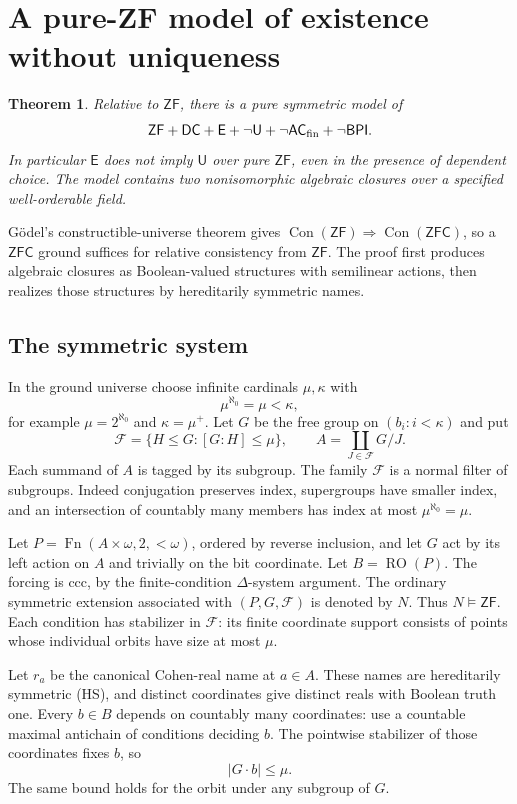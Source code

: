 \documentclass[11pt,a4paper]{article}
\newtheorem{theorem}{Theorem}[section]
\theoremstyle{definition}\newtheorem{definition}[theorem]{Definition}
\theoremstyle{remark}\newtheorem{remark}[theorem]{Remark}
\newcommand{\ZF}{\mathsf{ZF}}\newcommand{\ZFA}{\mathsf{ZFA}}
\newcommand{\E}{\mathsf E}\newcommand{\U}{\mathsf U}
\newcommand{\ACfin}{\mathsf{AC}_{\mathrm{fin}}}
\begin{document}
\section{A pure-ZF model of existence without uniqueness}\label{sec:pure-separation}
\begin{theorem}\label{thm:pure-zf-separation}
Relative to $\ZF$, there is a pure symmetric model of
\[
\ZF+\mathsf{DC}+\E+\neg\U+\neg\ACfin+\neg\BPI.
\]
In particular $\E$ does not imply $\U$ over pure $\ZF$, even in the presence of dependent choice. The model contains two nonisomorphic algebraic closures over a specified well-orderable field.
\end{theorem}
G\"odel's constructible-universe theorem gives $\operatorname{Con}(\ZF)\Rightarrow\operatorname{Con}(\mathsf{ZFC})$, so a $\mathsf{ZFC}$ ground suffices for relative consistency from $\ZF$.
The proof first produces algebraic closures as Boolean-valued structures with semilinear actions, then realizes those structures by hereditarily symmetric names.

\subsection{The symmetric system}
In the ground universe choose infinite cardinals $\mu,\kappa$ with
\[
\mu^{\aleph_0}=\mu<\kappa,
\]
for example $\mu=2^{\aleph_0}$ and $\kappa=\mu^+$. Let $G$ be the free group on $(b_i:i<\kappa)$ and put
\[
\mathcal F=\{H\leq G:[G:H]\leq\mu\},\qquad
A=\coprod_{J\in\mathcal F}G/J.
\]
Each summand of $A$ is tagged by its subgroup. The family $\mathcal F$ is a normal filter of subgroups. Indeed conjugation preserves index, supergroups have smaller index, and an intersection of countably many members has index at most $\mu^{\aleph_0}=\mu$.

Let $P=\operatorname{Fn}(A\times\omega,2,{<}\omega)$, ordered by reverse inclusion, and let $G$ act by its left action on $A$ and trivially on the bit coordinate. Let $B=\operatorname{RO}(P)$. The forcing is ccc, by the finite-condition $\Delta$-system argument. The ordinary symmetric extension associated with $(P,G,\mathcal F)$ is denoted by $N$. Thus $N\models\ZF$. Each condition has stabilizer in $\mathcal F$: its finite coordinate support consists of points whose individual orbits have size at most $\mu$.

Let $r_a$ be the canonical Cohen-real name at $a\in A$. These names are hereditarily symmetric (HS), and distinct coordinates give distinct reals with Boolean truth one. Every $b\in B$ depends on countably many coordinates: use a countable maximal antichain of conditions deciding $b$. The pointwise stabilizer of those coordinates fixes $b$, so
\begin{equation}\label{eq:boolean-small-orbit}
|G\cdot b|\leq\mu.
\end{equation}
The same bound holds for the orbit under any subgroup of $G$.
\end{document}
